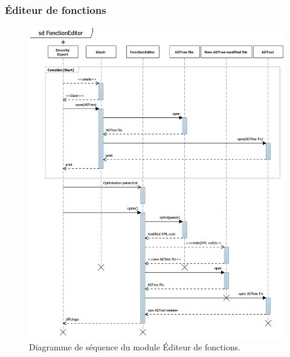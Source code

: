 	    \subsubsection{Éditeur de fonctions}

	    \begin{figure}[H]
	        \centering
	        \includegraphics[height=1\textwidth]{figure/FunctionEditor.png}
	        \caption{Diagramme de séquence du module Éditeur de fonctions.}
	        \label{fig:function}
	    \end{figure}